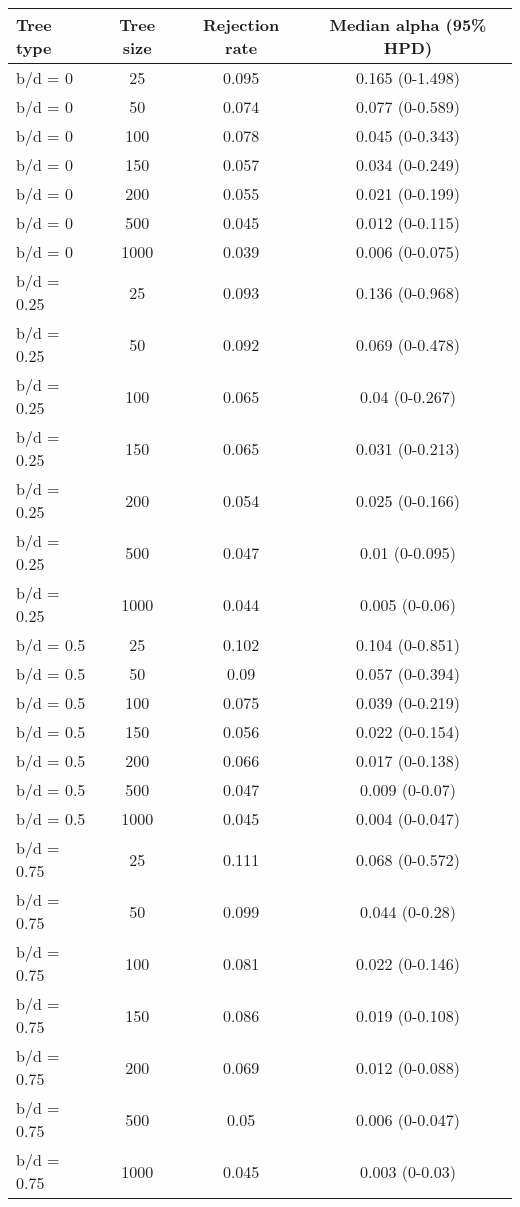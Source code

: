\begin{tabular}{lccc}
     \hline
     \textbf{Tree type} & \textbf{Tree size} & \textbf{Rejection rate}  & \textbf{Median alpha (95\% HPD)}    \\
     \hline
     b/d = 0 & 25  & 0.095 & 0.165 (0-1.498)   \\
     b/d = 0 & 50  & 0.074 & 0.077 (0-0.589)   \\
     b/d = 0 & 100 & 0.078 & 0.045 (0-0.343)   \\
     b/d = 0 & 150 & 0.057 & 0.034 (0-0.249)   \\
     b/d = 0 & 200 & 0.055 & 0.021 (0-0.199)   \\
     b/d = 0 & 500 & 0.045 & 0.012 (0-0.115)   \\
     b/d = 0 & 1000  & 0.039 & 0.006 (0-0.075)   \\
     b/d = 0.25  & 25  & 0.093 & 0.136 (0-0.968)   \\
     b/d = 0.25  & 50  & 0.092 & 0.069 (0-0.478)   \\
     b/d = 0.25  & 100 & 0.065 & 0.04 (0-0.267)    \\
     b/d = 0.25  & 150 & 0.065 & 0.031 (0-0.213)   \\
     b/d = 0.25  & 200 & 0.054 & 0.025 (0-0.166)   \\
     b/d = 0.25  & 500 & 0.047 & 0.01 (0-0.095)    \\
     b/d = 0.25  & 1000  & 0.044 & 0.005 (0-0.06)    \\
     b/d = 0.5 & 25  & 0.102 & 0.104 (0-0.851)   \\
     b/d = 0.5 & 50  & 0.09  & 0.057 (0-0.394)   \\
     b/d = 0.5 & 100 & 0.075 & 0.039 (0-0.219)   \\
     b/d = 0.5 & 150 & 0.056 & 0.022 (0-0.154)   \\
     b/d = 0.5 & 200 & 0.066 & 0.017 (0-0.138)   \\
     b/d = 0.5 & 500 & 0.047 & 0.009 (0-0.07)    \\
     b/d = 0.5 & 1000  & 0.045 & 0.004 (0-0.047)   \\
     b/d = 0.75  & 25  & 0.111 & 0.068 (0-0.572)   \\
     b/d = 0.75  & 50  & 0.099 & 0.044 (0-0.28)    \\
     b/d = 0.75  & 100 & 0.081 & 0.022 (0-0.146)   \\
     b/d = 0.75  & 150 & 0.086 & 0.019 (0-0.108)   \\
     b/d = 0.75  & 200 & 0.069 & 0.012 (0-0.088)   \\
     b/d = 0.75  & 500 & 0.05  & 0.006 (0-0.047)   \\
     b/d = 0.75  & 1000  & 0.045 & 0.003 (0-0.03)    \\
     \hline
\end{tabular}